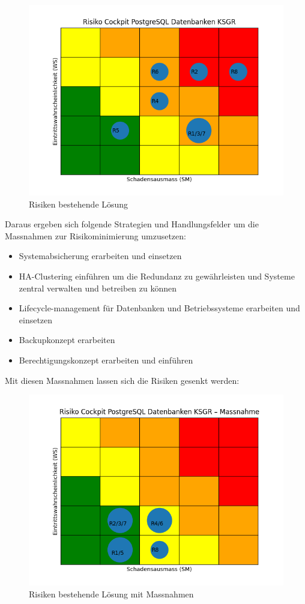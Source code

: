 \begin{figure}[H]
    \centering
    \includegraphics[width=0.75\linewidth]{source/riskmatrix/riskmatrixproblem}
    \caption{Risiken bestehende Lösung}
    \label{fig:riskmatrixproblem}
\end{figure}


Daraus ergeben sich folgende Strategien und Handlungsfelder um die Massnahmen zur Risikominimierung umzusetzen:
\begin{itemize}
    \item Systemabsicherung erarbeiten und einsetzen
    \item HA-Clustering einführen um die Redundanz zu gewährleisten und Systeme zentral verwalten und betreiben zu können
    \item Lifecycle-management für Datenbanken und Betriebssysteme erarbeiten und einsetzen
    \item Backupkonzept erarbeiten
    \item Berechtigungskonzept erarbeiten und einführen
\end{itemize}

Mit diesen Massnahmen lassen sich die Risiken gesenkt werden:
\begin{figure}[H]
    \centering
    \includegraphics[width=0.75\linewidth]{source/riskmatrix/Riskmatrixproblem-massnahmen}
    \caption{Risiken bestehende Lösung mit Massnahmen}
    \label{fig:riskmatrixproblem-massnahmen}
\end{figure}